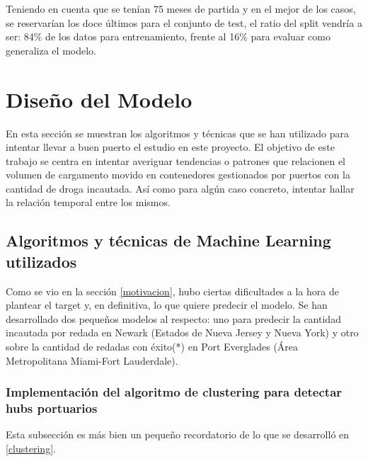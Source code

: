 \documentclass[12pt]{article}
\begin{document}
	Teniendo en cuenta que se tenían 75 meses de partida y en el mejor de los casos, se reservarían los doce últimos para el conjunto de test, el ratio del split vendría a ser: 84\% de los datos para entrenamiento, frente al 16\% para evaluar como generaliza el modelo.
	

\newpage
\section{\label{Diseño}Diseño del Modelo}
En esta sección se muestran los algoritmos y técnicas que se han utilizado para intentar llevar a buen puerto el estudio en este proyecto. El objetivo de este trabajo se centra en intentar averiguar tendencias o patrones que relacionen el volumen de cargamento movido en contenedores gestionados por puertos con la cantidad de droga incautada. Así como para algún caso concreto, intentar hallar la relación temporal entre los mismos.

	\subsection{Algoritmos y técnicas de Machine Learning utilizados}

	
	Como se vio en la sección \ref{motivacion}, hubo ciertas dificultades a la hora de plantear el target y, en definitiva, lo que quiere predecir el modelo. Se han desarrollado dos pequeños modelos al respecto: uno para predecir la cantidad incautada por redada en Newark (Estados de Nueva Jersey y Nueva York) y otro sobre la cantidad de redadas con éxito(*) en Port Everglades (Área Metropolitana Miami-Fort Lauderdale).
	
	\subsubsection{Implementación del algoritmo de clustering para detectar hubs portuarios}
	Esta subsección es más bien un pequeño recordatorio de lo que se desarrolló en \ref{clustering}.
	
\end{document}
